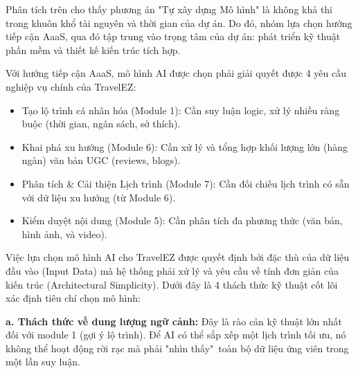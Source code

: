 Phân tích trên cho thấy phương án "Tự xây dựng Mô hình" là không khả thi trong khuôn khổ tài nguyên và thời gian của dự án. Do đó, nhóm lựa chọn hướng tiếp cận AaaS, qua đó tập trung vào trọng tâm của dự án: phát triển kỹ thuật phần mềm và thiết kế kiến trúc tích hợp.

Với hướng tiếp cận AaaS, mô hình AI được chọn phải giải quyết được 4 yêu cầu nghiệp vụ chính của TravelEZ:

\begin{itemize}
    \item Tạo lộ trình cá nhân hóa (Module 1): Cần suy luận logic, xử lý nhiều ràng buộc (thời gian, ngân sách, sở thích).
    \item Khai phá xu hướng (Module 6): Cần xử lý và tổng hợp khối lượng lớn (hàng ngàn) văn bản UGC (reviews, blogs).
    \item Phân tích \& Cải thiện Lịch trình (Module 7): Cần đối chiếu lịch trình có sẵn với dữ liệu xu hướng (từ Module 6).
    \item Kiểm duyệt nội dung (Module 5): Cần phân tích đa phương thức (văn bản, hình ảnh, và video).
\end{itemize}


Việc lựa chọn mô hình AI cho TravelEZ được quyết định bởi đặc thù của dữ liệu đầu vào (Input Data) mà hệ thống phải xử lý và yêu cầu về tính đơn giản của kiến trúc (Architectural Simplicity). Dưới đây là 4 thách thức kỹ thuật cốt lõi xác định tiêu chí chọn mô hình:

\textbf{a. Thách thức về dung lượng ngữ cảnh:} Đây là rào cản kỹ thuật lớn nhất đối với module 1 (gợi ý lộ trình). Để AI có thể sắp xếp một lịch trình tối ưu, nó không thể hoạt động rời rạc mà phải "nhìn thấy"\ toàn bộ dữ liệu ứng viên trong một lần suy luận.

